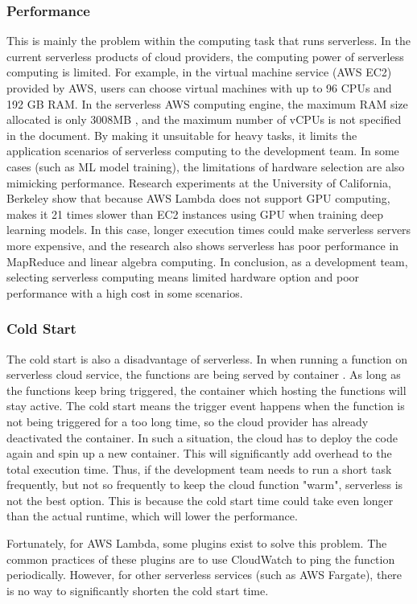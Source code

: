 \subsubsection{Performance}
\label{servlesslimitationPer}
This is mainly the problem within the computing task that runs serverless. In the current serverless products of cloud providers, the computing power of serverless computing is limited. 
For example, in the virtual machine service (AWS EC2) provided by AWS, users can choose virtual machines with up to 96 CPUs and 192 GB RAM. In the serverless AWS computing engine, the maximum RAM size allocated is only 3008MB \cite{AWSLambd13:online}, and the maximum number of vCPUs is not specified in the document.
By making it unsuitable for heavy tasks, it limits the application scenarios of serverless computing to the development team.
In some cases (such as ML model training), the limitations of hardware selection are also mimicking performance. Research experiments \cite{jonas2019cloud} at the University of California, Berkeley show that because AWS Lambda does not support GPU computing, makes it 21 times slower than EC2 instances using GPU \cite{hellerstein2018serverless} when training deep learning models. In this case, longer execution times could make serverless servers more expensive, and the research also shows serverless has poor performance in MapReduce and linear
algebra computing. In conclusion, as a development team, selecting serverless computing means limited hardware option and poor performance with a high cost in some scenarios.
\subsubsection{Cold Start}
The cold start is also a disadvantage of serverless. In when running a function on serverless cloud service, the functions are being served by container \cite{KeepingF68:online}. As long as the functions keep bring triggered, the container which hosting the functions will stay active. The cold start means the trigger event happens when the function is not being triggered for a too long time, so the cloud provider has already deactivated the container. In such a situation, the cloud has to deploy the code again and spin up a new container. This will significantly add overhead to the total execution time. 
Thus, if the development team needs to run a short task frequently, but not so frequently to keep the cloud function "warm", serverless is not the best option. This is because the cold start time could take even longer than the actual runtime, which will lower the performance. 
\par
Fortunately, for AWS Lambda, some plugins exist to solve this problem. The common practices of these plugins are to use CloudWatch to ping the function periodically. However, for other serverless services (such as AWS Fargate), there is no way to significantly shorten the cold start time.
